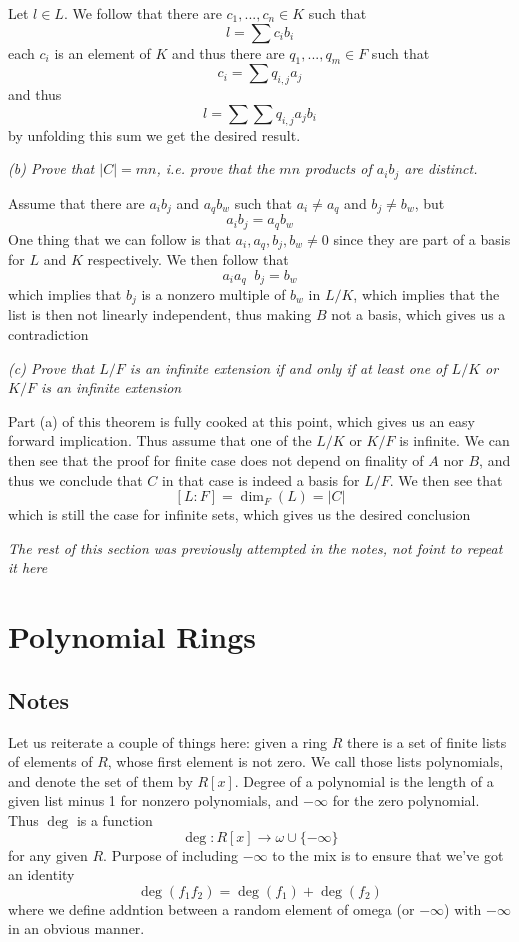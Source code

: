 \documentclass[11pt,oneside,titlepage]{book}
\DeclareMathOperator \inv {^{-1}}
\newcommand{\set}[1]{\{ #1 \}}
\begin{document}
Let $l \in L$. We follow that there are $c_1, ..., c_n \in K$ such that
$$l = \sum{c_i b_i}$$
each $c_i$ is an element of $K$ and thus there are $q_1, ..., q_m \in F$
such that
$$c_i = \sum{q_{i, j} a_j}$$
and thus
$$l = \sum{\sum{q_{i, j} a_j} b_i}$$
by unfolding this sum we get the desired result.

\textit{(b) Prove that $|C| = mn$, i.e. prove that the $mn$ products
  of $a_i b_j$ are distinct.}

Assume that there are $a_i b_j$ and $a_q b_w$ such that
$a_i \neq a_q$ and $b_j \neq b_w$, but
$$a_i b_j = a_q b_w$$
One thing that we can follow is that $a_i, a_q, b_j, b_w \neq 0$ since
they are part of a basis for $L$ and $K$ respectively.
We then follow that
$$a_i a_q \inv b_j = b_w$$
which implies that $b_j$ is a nonzero multiple of $b_w$ in $L/K$,
which implies that the list is then not linearly independent, thus
making $B$ not a basis, which gives us a contradiction

\textit{(c) Prove that $L/F$ is an infinite extension if and only
  if at least one of $L/K$ or $K/F$ is
  an infinite extension}

Part (a) of this theorem is fully cooked at this point, which gives us
an easy forward implication. Thus assume that one of the $L/K$ or $K/F$
is infinite. We can then see that the proof for finite case does not
depend on finality of $A$ nor $B$, and thus we conclude that $C$
in that case is indeed a basis for $L/F$. We then see that
$$[L:F] = \dim_F(L) = |C|$$
which is still the case for infinite sets, which gives us the desired
conclusion

\textit{The rest of this section was previously attempted in the notes,
not foint to repeat it here}

\section{Polynomial Rings}

\subsection*{Notes}

Let us reiterate a couple of things here: given a ring $R$ there is a
set of finite lists of elements of $R$, whose first element is not
zero. We call those lists polynomials, and denote the set of
them by $R[x]$. Degree of a polynomial is the length of a given list
minus 1 for nonzero polynomials, and $-\infty$ for the zero
polynomial. Thus $\deg$ is a function
$$\deg: R[x] \to \omega \cup \set{-\infty}$$
for any given $R$. Purpose of including $-\infty$ to the mix is to
ensure that we've got an identity
$$\deg(f_1 f_2) = \deg(f_1) + \deg(f_2)$$
where we define addntion between a random element of omega (or
$-\infty$) with $-\infty$ in an obvious manner.
\end{document}
